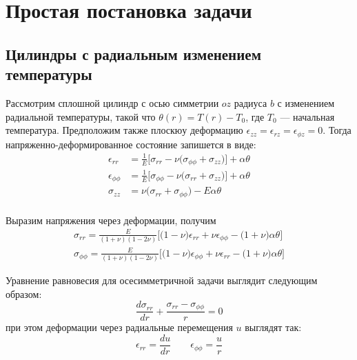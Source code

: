 \chapter{Простая постановка задачи}\label{ch:ch1}

\section{Цилиндры с радиальным изменением температуры}\label{sec:ch1/sec1}

Рассмотрим сплошной цилиндр с осью симметрии \(oz\) радиуса \(b\) с изменением радиальной температуры, такой что \(\theta(r)=T(r)-T_0\), где \(T_0\) --- начальная температура. Предположим также плоскюу деформацию \(\epsilon_{zz}=\epsilon_{rz}=\epsilon_{\phi z}=0\). Тогда напряженно-деформированное состояние запишется в виде:
\begin{equation}
	\label{eq:equation1}
\begin{split}
	\epsilon_{rr} &= \frac{1}{E} \big [\sigma_{rr} - \nu \big(\sigma_{\phi\phi} + \sigma_{zz}\big) \big] + \alpha \theta \\
	\epsilon_{\phi\phi} &= \frac{1}{E} \big [\sigma_{\phi\phi} - \nu \big(\sigma_{rr} + \sigma_{zz}\big) \big] + \alpha \theta \\
	\sigma_{zz} &= \nu \big(\sigma_{rr} + \sigma_{\phi\phi}\big) - E\alpha\theta \\
\end{split}
\end{equation}	

Выразим напряжения через деформации, получим
\begin{equation}
	\label{eq:equation2}
	\begin{split}
		\sigma_{rr} = \frac{E}{(1+\nu)(1-2\nu)} \big[\big(1-\nu \big)\epsilon_{rr} + \nu\epsilon_{\phi\phi} - \big(1+\nu\big )\alpha\theta\big] \\
		\sigma_{\phi\phi} = \frac{E}{(1+\nu)(1-2\nu)} \big[\big(1-\nu \big)\epsilon_{\phi\phi} + \nu\epsilon_{rr} - \big(1+\nu\big )\alpha\theta\big] 
	\end{split}
\end{equation}

Уравнение равновесия для осесимметричной задачи выглядит следующим образом:
\begin{equation}
	\label{eq:equation3}
		\frac {d\sigma_{rr} }{dr} + \frac {\sigma_{rr}-\sigma_{\phi\phi}}{r}=0
\end{equation}
при этом деформации через радиальные перемещения \(u\) выглядят так:
\begin{equation}
	\label{eq:equation4}
	\epsilon_{rr} = \frac{du}{dr} \qquad \epsilon_{\phi\phi} = \frac{u}{r}
\end{equation}

